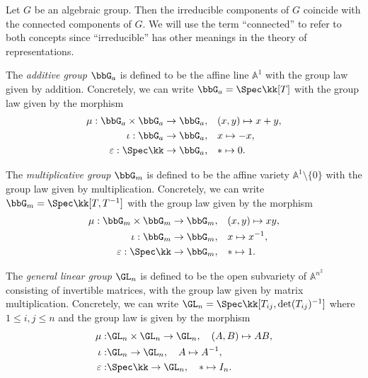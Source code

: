     \begin{remark}\label{rmk:irreducible_and_connected_components_of_algebraic_group}
        Let \(G\) be an algebraic group.
        Then the irreducible components of \(G\) coincide with the connected components of \(G\).
        We will use the term ``connected'' to refer to both concepts since ``irreducible'' has other meanings in the theory of representations.
    \end{remark}

    \begin{example}\label{eg:additive_group}
        The \emph{additive group} $\bbG_a$ is defined to be the affine line $\mathbb{A}^1$ with the group law given by addition.
        Concretely, we can write $\bbG_a = \Spec \kk[T]$ with the group law given by the morphism
        \begin{align*}
            \mu:\bbG_a \times \bbG_a \to \bbG_a, \quad & (x,y) \mapsto x+y, \\
            \iota:\bbG_a \to \bbG_a, \quad & x \mapsto -x, \\
            \varepsilon:\Spec \kk \to \bbG_a, \quad & * \mapsto 0.
        \end{align*}
    \end{example}

    \begin{example}\label{eg:multiplicative_group}
        The \emph{multiplicative group} $\bbG_m$ is defined to be the affine variety $\mathbb{A}^1 \setminus \{0\}$ with the group law given by multiplication.
        Concretely, we can write $\bbG_m = \Spec \kk[T,T^{-1}]$ with the group law given by the morphism
        \begin{align*}
            \mu: \bbG_m \times \bbG_m \to \bbG_m, \quad & (x,y) \mapsto xy, \\
            \iota: \bbG_m \to \bbG_m, \quad & x \mapsto x^{-1}, \\
            \varepsilon: \Spec \kk \to \bbG_m, \quad & * \mapsto 1.
        \end{align*}
    \end{example}

    \begin{example}\label{eg:general_linear_group}
        The \emph{general linear group} $\GL_n$ is defined to be the open subvariety of $\mathbb{A}^{n^2}$ consisting of invertible matrices, with the group law given by matrix multiplication.
        Concretely, we can write \(\GL_n = \Spec \kk[T_{ij}, \det(T_{ij})^{-1}]\) where \(1 \leq i,j \leq n\) and the group law is given by the morphism
        \begin{align*}
            \mu: & \GL_n \times \GL_n \to \GL_n, \quad (A,B) \mapsto AB, \\
            \iota: & \GL_n \to \GL_n, \quad A \mapsto A^{-1}, \\
            \varepsilon: & \Spec \kk \to \GL_n, \quad * \mapsto I_n.
        \end{align*}
    \end{example}

